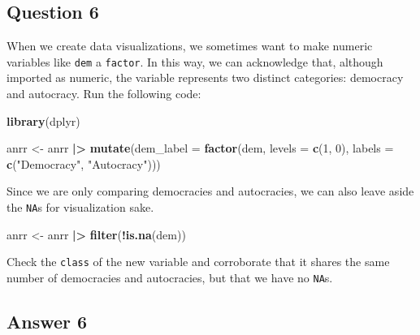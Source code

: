 \documentclass[
  11pt,
  letterpaper]{article}
\newenvironment{Shaded}{\begin{snugshade}}{\end{snugshade}}
\newcommand{\AttributeTok}[1]{\textcolor[rgb]{0.13,0.29,0.53}{#1}}
\newcommand{\DecValTok}[1]{\textcolor[rgb]{0.00,0.00,0.81}{#1}}
\newcommand{\FunctionTok}[1]{\textcolor[rgb]{0.13,0.29,0.53}{\textbf{#1}}}
\newcommand{\NormalTok}[1]{#1}
\newcommand{\OtherTok}[1]{\textcolor[rgb]{0.56,0.35,0.01}{#1}}
\newcommand{\SpecialCharTok}[1]{\textcolor[rgb]{0.81,0.36,0.00}{\textbf{#1}}}
\newcommand{\StringTok}[1]{\textcolor[rgb]{0.31,0.60,0.02}{#1}}
\begin{document}
\subsection{Question 6}\label{question-6}

When we create data visualizations, we sometimes want to make numeric
variables like \texttt{dem} a \texttt{factor}. In this way, we can
acknowledge that, although imported as numeric, the variable represents
two distinct categories: democracy and autocracy. Run the following
code:

\begin{Shaded}
\begin{Highlighting}[]
\FunctionTok{library}\NormalTok{(dplyr)}

\NormalTok{anrr }\OtherTok{\textless{}{-}}\NormalTok{ anrr }\SpecialCharTok{|\textgreater{}}
  \FunctionTok{mutate}\NormalTok{(}\AttributeTok{dem\_label =} \FunctionTok{factor}\NormalTok{(dem, }
                           \AttributeTok{levels =} \FunctionTok{c}\NormalTok{(}\DecValTok{1}\NormalTok{, }\DecValTok{0}\NormalTok{),}
                           \AttributeTok{labels =} \FunctionTok{c}\NormalTok{(}\StringTok{"Democracy"}\NormalTok{, }\StringTok{"Autocracy"}\NormalTok{)))}
\end{Highlighting}
\end{Shaded}

Since we are only comparing democracies and autocracies, we can also
leave aside the \texttt{NA}s for visualization sake.

\begin{Shaded}
\begin{Highlighting}[]
\NormalTok{anrr }\OtherTok{\textless{}{-}}\NormalTok{ anrr }\SpecialCharTok{|\textgreater{}}
  \FunctionTok{filter}\NormalTok{(}\SpecialCharTok{!}\FunctionTok{is.na}\NormalTok{(dem))}
\end{Highlighting}
\end{Shaded}

Check the \texttt{class} of the new variable and corroborate that it
shares the same number of democracies and autocracies, but that we have
no \texttt{NA}s.

\subsection{Answer 6}\label{answer-6}
\end{document}
